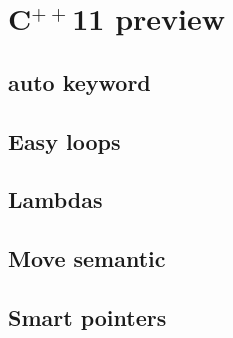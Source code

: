 \section[C$^{++}$11]{C$^{++}$11 preview}
\subsection[Auto]{auto keyword}
\subsection{Easy loops}
\subsection{Lambdas}
\subsection{Move semantic}
\subsection{Smart pointers}
